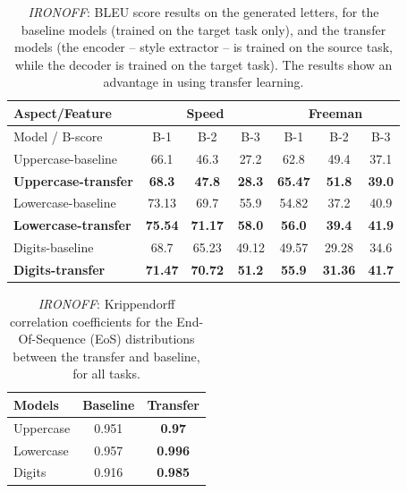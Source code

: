       \begin{table}[!htbp]
        \centering
        \begin{tabular}{l c c c|c c c}
          \hline
          \multicolumn{1}{l}{Aspect/Feature} & \multicolumn{3}{c}{ Speed } & \multicolumn{3}{c}{ Freeman }   \\ \hline
          Model / B-score      & B-1  & B-2  & B-3           & B-1  & B-2   & B-3              \\ \hline
          Uppercase-baseline &   66.1 & 46.3 & 27.2 & 62.8 & 49.4 & 37.1 \\%
          \textbf{Uppercase-transfer} &   \textbf{68.3} & \textbf{47.8} & \textbf{28.3} & \textbf{65.47} & \textbf{51.8} & \textbf{39.0} \\%

          Lowercase-baseline &   73.13 & 69.7 & 55.9 & 54.82 & 37.2 & 40.9 \\%
          \textbf{Lowercase-transfer} &   \textbf{75.54} & \textbf{71.17} & \textbf{58.0} & \textbf{56.0} & \textbf{39.4} & \textbf{41.9} \\%

          Digits-baseline &    68.7 & 65.23 & 49.12 & 49.57 & 29.28 & 34.6  \\%
          \textbf{Digits-transfer} &    \textbf{71.47} & \textbf{70.72} & \textbf{51.2} & \textbf{55.9} & \textbf{31.36} & \textbf{41.7} \\\hline

        \end{tabular}
        \caption{\textit{IRONOFF}: BLEU score results on the generated letters, for the baseline models (trained on the target task only), and the transfer models (the encoder -- style extractor -- is trained on the source task, while the decoder is trained on the target task). The results show an advantage in using transfer learning.}
        \label{table:bleu_score_ironoff_transfer}
      \end{table}

      \begin{table}[!htbp]
        \centering
        \begin{tabular}{l c c} \hline
        Models & Baseline & Transfer \\ \hline
        Uppercase & 0.951 &  \textbf{0.97}\\ %
        Lowercase & 0.957 & \textbf{0.996} \\ %
        Digits & 0.916 & \textbf{0.985} \\ \hline
        \end{tabular}
        \caption{\textit{IRONOFF}: Krippendorff correlation coefficients for the End-Of-Sequence (EoS) distributions between the transfer and baseline, for all tasks.}
        \label{table:ironoff_eos_transfer}
      \end{table}

